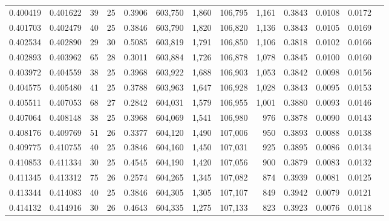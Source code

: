 \begin{tabular}{rrrrrrrrrrrrr}
0.400419 & 0.401622 &  39 &  25 &                                     0.3906 & 603,750 &   1,860 & 106,795 &   1,161 & 0.3843 & 0.0108 & 0.0172 \\
0.401703 & 0.402479 &  40 &  25 &                                     0.3846 & 603,790 &   1,820 & 106,820 &   1,136 & 0.3843 & 0.0105 & 0.0169 \\
0.402534 & 0.402890 &  29 &  30 &                                     0.5085 & 603,819 &   1,791 & 106,850 &   1,106 & 0.3818 & 0.0102 & 0.0166 \\
0.402893 & 0.403962 &  65 &  28 &                                     0.3011 & 603,884 &   1,726 & 106,878 &   1,078 & 0.3845 & 0.0100 & 0.0160 \\
0.403972 & 0.404559 &  38 &  25 &                                     0.3968 & 603,922 &   1,688 & 106,903 &   1,053 & 0.3842 & 0.0098 & 0.0156 \\
0.404575 & 0.405480 &  41 &  25 &                                     0.3788 & 603,963 &   1,647 & 106,928 &   1,028 & 0.3843 & 0.0095 & 0.0153 \\
0.405511 & 0.407053 &  68 &  27 &                                     0.2842 & 604,031 &   1,579 & 106,955 &   1,001 & 0.3880 & 0.0093 & 0.0146 \\
0.407064 & 0.408148 &  38 &  25 &                                     0.3968 & 604,069 &   1,541 & 106,980 &     976 & 0.3878 & 0.0090 & 0.0143 \\
0.408176 & 0.409769 &  51 &  26 &                                     0.3377 & 604,120 &   1,490 & 107,006 &     950 & 0.3893 & 0.0088 & 0.0138 \\
0.409775 & 0.410755 &  40 &  25 &                                     0.3846 & 604,160 &   1,450 & 107,031 &     925 & 0.3895 & 0.0086 & 0.0134 \\
0.410853 & 0.411334 &  30 &  25 &                                     0.4545 & 604,190 &   1,420 & 107,056 &     900 & 0.3879 & 0.0083 & 0.0132 \\
0.411345 & 0.413312 &  75 &  26 &                                     0.2574 & 604,265 &   1,345 & 107,082 &     874 & 0.3939 & 0.0081 & 0.0125 \\
0.413344 & 0.414083 &  40 &  25 &                                     0.3846 & 604,305 &   1,305 & 107,107 &     849 & 0.3942 & 0.0079 & 0.0121 \\
0.414132 & 0.414916 &  30 &  26 &                                     0.4643 & 604,335 &   1,275 & 107,133 &     823 & 0.3923 & 0.0076 & 0.0118 \\

\end{tabular}
